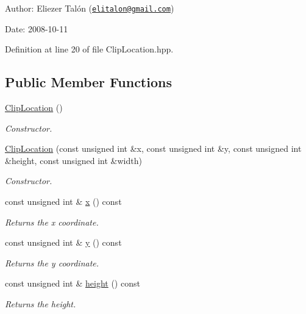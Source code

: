 \begin{Desc}
\item[Author:]Eliezer Talón (\href{mailto:elitalon@gmail.com}{\tt elitalon@gmail.com}) \end{Desc}
\begin{Desc}
\item[Date:]2008-10-11 \end{Desc}


Definition at line 20 of file ClipLocation.hpp.\subsection*{Public Member Functions}
\begin{CompactItemize}
\item 
\hyperlink{class_clip_location_fb51ec03e0a8f9b33f4d785550bc6b84}{ClipLocation} ()
\begin{CompactList}\small\item\em Constructor. \item\end{CompactList}\item 
\hyperlink{class_clip_location_df3b25b12a4ce75a657ae79f241c61c2}{ClipLocation} (const unsigned int \&x, const unsigned int \&y, const unsigned int \&height, const unsigned int \&width)
\begin{CompactList}\small\item\em Constructor. \item\end{CompactList}\item 
const unsigned int \& \hyperlink{class_clip_location_6dd58945e53e1d04ae736dafb3c43576}{x} () const 
\begin{CompactList}\small\item\em Returns the x coordinate. \item\end{CompactList}\item 
const unsigned int \& \hyperlink{class_clip_location_f80b2bfd8f35cb5e0a6e02c73f21695b}{y} () const 
\begin{CompactList}\small\item\em Returns the y coordinate. \item\end{CompactList}\item 
const unsigned int \& \hyperlink{class_clip_location_e18ec2c31e76a983acdbaec9d3bad659}{height} () const 
\begin{CompactList}\small\item\em Returns the height. \item\end{CompactList}\item 

\end{CompactItemize}
